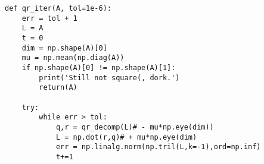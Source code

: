 \documentclass[10pt,a4paper]{article}
\begin{document}
\begin{verbatim}
def qr_iter(A, tol=1e-6):                                                                                                                                                                  
    err = tol + 1                                                                                                                                                                          
    L = A                                                                                                                                                                                  
    t = 0                                                                                                                                                                                  
    dim = np.shape(A)[0]                                                                                                                                                                   
    mu = np.mean(np.diag(A))                                                                                                                                                               
    if np.shape(A)[0] != np.shape(A)[1]:                                                                                                                                                   
        print('Still not square(, dork.')                                                                                                                                                  
        return(A)                                                                                                                                                                          
                                                                                                                                                                                           
    try:                                                                                                                                                                                   
        while err > tol:                                                                                                                                                                   
            q,r = qr_decomp(L)# - mu*np.eye(dim))                                                                                                                                          
            L = np.dot(r,q)# + mu*np.eye(dim)                                                                                                                                              
            err = np.linalg.norm(np.tril(L,k=-1),ord=np.inf)                                                                                                                               
            t+=1                                                                                                                                                                           
                                                                                                                                                                                           

\end{verbatim}
\end{document}
